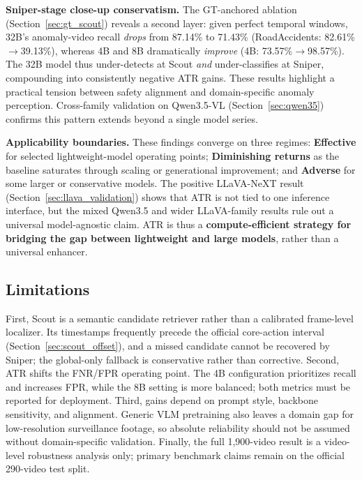 \textbf{Sniper-stage close-up conservatism.}
The GT-anchored ablation (Section~\ref{sec:gt_scout}) reveals a second layer: given perfect temporal windows, 32B's anomaly-video recall \emph{drops} from 87.14\% to 71.43\% (RoadAccidents: 82.61\%$\rightarrow$39.13\%), whereas 4B and 8B dramatically \emph{improve} (4B: 73.57\%$\rightarrow$98.57\%). The 32B model thus under-detects at Scout \emph{and} under-classifies at Sniper, compounding into consistently negative ATR gains. These results highlight a practical tension between safety alignment and domain-specific anomaly perception. Cross-family validation on Qwen3.5-VL (Section~\ref{sec:qwen35}) confirms this pattern extends beyond a single model series.

\label{sec:boundaries}
\textbf{Applicability boundaries.} These findings converge on three regimes: \textbf{Effective} for selected lightweight-model operating points; \textbf{Diminishing returns} as the baseline saturates through scaling or generational improvement; and \textbf{Adverse} for some larger or conservative models. The positive LLaVA-NeXT result (Section~\ref{sec:llava_validation}) shows that ATR is not tied to one inference interface, but the mixed Qwen3.5 and wider LLaVA-family results rule out a universal model-agnostic claim. ATR is thus a \textbf{compute-efficient strategy for bridging the gap between lightweight and large models}, rather than a universal enhancer.

\subsection{Limitations}

First, Scout is a semantic candidate retriever rather than a calibrated frame-level localizer. Its timestamps frequently precede the official core-action interval (Section~\ref{sec:scout_offset}), and a missed candidate cannot be recovered by Sniper; the global-only fallback is conservative rather than corrective. Second, ATR shifts the FNR/FPR operating point. The 4B configuration prioritizes recall and increases FPR, while the 8B setting is more balanced; both metrics must be reported for deployment. Third, gains depend on prompt style, backbone sensitivity, and alignment. Generic VLM pretraining also leaves a domain gap for low-resolution surveillance footage, so absolute reliability should not be assumed without domain-specific validation. Finally, the full 1{,}900-video result is a video-level robustness analysis only; primary benchmark claims remain on the official 290-video test split.
